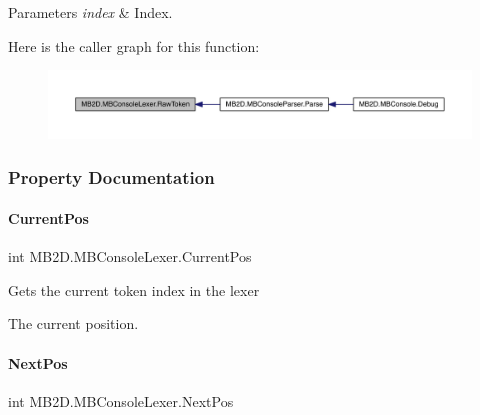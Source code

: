 \begin{DoxyParams}{Parameters}
{\em index} & Index.\\
\hline
\end{DoxyParams}
Here is the caller graph for this function\+:
\nopagebreak
\begin{figure}[H]
\begin{center}
\leavevmode
\includegraphics[width=350pt]{class_m_b2_d_1_1_m_b_console_lexer_a9f08e0a2739eb027f6b8c46abe67f647_icgraph}
\end{center}
\end{figure}


\subsubsection{Property Documentation}
\hypertarget{class_m_b2_d_1_1_m_b_console_lexer_a15d3752a0f36b998985befdabfdb475e}{}\label{class_m_b2_d_1_1_m_b_console_lexer_a15d3752a0f36b998985befdabfdb475e} 
\paragraph{\texorpdfstring{Current\+Pos}{CurrentPos}}
{\footnotesize\ttfamily int M\+B2\+D.\+M\+B\+Console\+Lexer.\+Current\+Pos\hspace{0.3cm}{\ttfamily [get]}}



Gets the current token index in the lexer 

The current position.\hypertarget{class_m_b2_d_1_1_m_b_console_lexer_aa3535c7e87e9d7855e3fb7848bf46ba8}{}\label{class_m_b2_d_1_1_m_b_console_lexer_aa3535c7e87e9d7855e3fb7848bf46ba8} 
\paragraph{\texorpdfstring{Next\+Pos}{NextPos}}
{\footnotesize\ttfamily int M\+B2\+D.\+M\+B\+Console\+Lexer.\+Next\+Pos\hspace{0.3cm}{\ttfamily [get]}}



